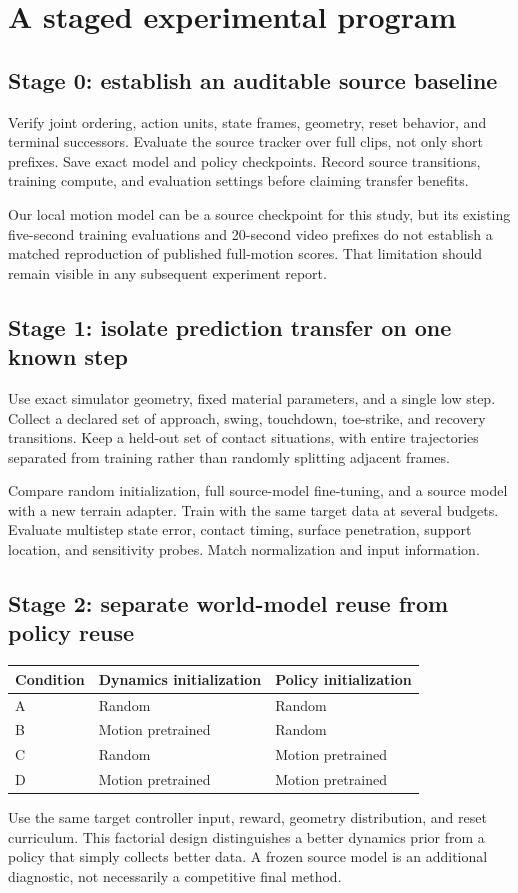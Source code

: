\section{A staged experimental program}\label{sec:experiments}
\subsection{Stage 0: establish an auditable source baseline}
Verify joint ordering, action units, state frames, geometry, reset behavior, and
terminal successors. Evaluate the source tracker over full clips, not only short
prefixes. Save exact model and policy checkpoints. Record source transitions,
training compute, and evaluation settings before claiming transfer benefits.

Our local motion model can be a source checkpoint for this study, but its
existing five-second training evaluations and 20-second video prefixes do not
establish a matched reproduction of published full-motion scores. That limitation
should remain visible in any subsequent experiment report.

\subsection{Stage 1: isolate prediction transfer on one known step}
Use exact simulator geometry, fixed material parameters, and a single low step.
Collect a declared set of approach, swing, touchdown, toe-strike, and recovery
transitions. Keep a held-out set of contact situations, with entire trajectories
separated from training rather than randomly splitting adjacent frames.

Compare random initialization, full source-model fine-tuning, and a source model
with a new terrain adapter. Train with the same target data at several budgets.
Evaluate multistep state error, contact timing, surface penetration, support
location, and sensitivity probes. Match normalization and input information.

\subsection{Stage 2: separate world-model reuse from policy reuse}
\begin{center}
\begin{tabular}{@{}lll@{}}
\toprule Condition & Dynamics initialization & Policy initialization\\\midrule
A & Random & Random\\
B & Motion pretrained & Random\\
C & Random & Motion pretrained\\
D & Motion pretrained & Motion pretrained\\
\bottomrule
\end{tabular}
\end{center}
Use the same target controller input, reward, geometry distribution, and reset
curriculum. This factorial design distinguishes a better dynamics prior from
a policy that simply collects better data. A frozen source model is an additional
diagnostic, not necessarily a competitive final method.

